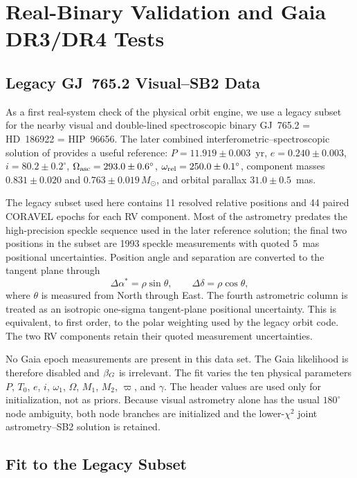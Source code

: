 \section{Real-Binary Validation and Gaia DR3/DR4 Tests}
\label{sect:realdata}

\subsection{Legacy GJ~765.2 Visual--SB2 Data}

As a first real-system check of the physical orbit engine, we use a legacy subset for the nearby visual and double-lined spectroscopic binary GJ~765.2 = HD~186922 = HIP~96656. The later combined interferometric--spectroscopic solution of \citet{Balega2007} provides a useful reference: $P=11.919\pm0.003$~yr, $e=0.240\pm0.003$, $i=80.2\pm0.2^\circ$, $\Omega_{\rm asc}=293.0\pm0.6^\circ$, $\omega_{\rm rel}=250.0\pm0.1^\circ$, component masses $0.831\pm0.020$ and $0.763\pm0.019\,M_\odot$, and orbital parallax $31.0\pm0.5$~mas.

The legacy subset used here contains 11 resolved relative positions and 44 paired CORAVEL epochs for each RV component. Most of the astrometry predates the high-precision speckle sequence used in the later reference solution; the final two positions in the subset are 1993 speckle measurements with quoted 5~mas positional uncertainties. Position angle and separation are converted to the tangent plane through
\begin{equation}
\Delta\alpha^*=\rho\sin\theta,\qquad
\Delta\delta=\rho\cos\theta,
\end{equation}
where $\theta$ is measured from North through East. The fourth astrometric column is treated as an isotropic one-sigma tangent-plane positional uncertainty. This is equivalent, to first order, to the polar weighting used by the legacy orbit code. The two RV components retain their quoted measurement uncertainties.

No Gaia epoch measurements are present in this data set. The Gaia likelihood is therefore disabled and $\beta_G$ is irrelevant. The fit varies the ten physical parameters $P$, $T_0$, $e$, $i$, $\omega_1$, $\Omega$, $M_1$, $M_2$, $\varpi$, and $\gamma$. The header values are used only for initialization, not as priors. Because visual astrometry alone has the usual $180^\circ$ node ambiguity, both node branches are initialized and the lower-$\chi^2$ joint astrometry--SB2 solution is retained.

\subsection{Fit to the Legacy Subset}

